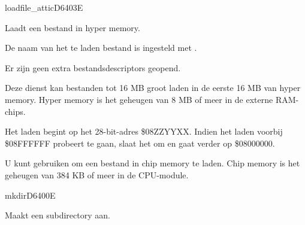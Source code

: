 \newpage
\begin{hyppotrap}{loadfile\_attic}{D640}{3E}

\item [Dienst:]  Laadt een bestand in hyper memory.
\item [Voorwaarden:]  De naam van het te laden bestand is ingesteld met .
\item [Invoer:]      
\item [Nawerkingen:]  Er zijn geen extra bestandsdescriptors geopend.
\item [Foutcodes:]    
\item [Geschiedenis:]
\item [Opmerkingen:]  Deze dienst kan bestanden tot 16 MB groot laden in de eerste 16 MB van hyper memory. Hyper memory is het geheugen van 8 MB of meer in de externe RAM-chips.

  Het laden begint op het 28-bit-adres \$08ZZYYXX. Indien het laden voorbij \$08FFFFFF probeert te gaan, slaat het om en gaat verder op \$08000000.

  U kunt  gebruiken om een bestand in chip memory te laden. Chip memory is het geheugen van 384 KB of meer in de CPU-module.
\end{hyppotrap}


\newpage
\begin{hyppotrap}{mkdir}{D640}{0E}

\item [Dienst:]  Maakt een subdirectory aan.
\item [Foutcodes:]  
\notimplemented
\end{hyppotrap}


